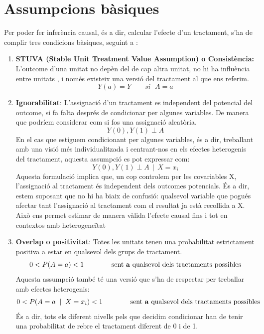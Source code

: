 \documentclass[../main.tex]{subfiles}
\begin{document}
    \section{Assumpcions bàsiques}\label{sec:assumpcions}
    Per poder fer inferència causal, és a dir, calcular l’efecte d’un tractament, s’ha de complir tres condicions bàsiques, seguint a \citep{abecassis2024}:
    \begin{enumerate}
        \item \textbf{STUVA (Stable Unit Treatment Value Assumption) o Consistència:} L’outcome d’una unitat no depèn del de cap altra unitat, no hi ha influència entre unitats , i només existeix una versió del tractament al que ens referim.
        \begin{equation}
            Y(a)=Y\qquad si\;\,\,A=a
        \end{equation}
        
        \item \textbf{Ignorabilitat}: L’assignació d’un tractament es independent del potencial del outcome, si fa falta després de condicionar per algunes variables. De manera que podríem considerar com si fos una assignació aleatòria.
        \begin{equation}
            Y(0),Y(1)\perp A
        \end{equation}
        En el cas que estiguem condicionant per algunes variables, és a dir, treballant amb una visió més individualitzada i centrant-nos en els efectes heterogenis del tractament, aquesta assumpció es pot expressar com:
        \begin{equation}
            Y(0),Y(1)\perp A\,\mid\,X=x_i
        \end{equation}
        Aquesta formulació implica que, un cop controlem per les covariables X, l’assignació al tractament és independent dels outcomes potencials. És a dir, estem suposant que no hi ha biaix de confusió: qualsevol variable que pogués afectar tant l’assignació al tractament com el resultat ja està recollida a X. Això ens permet estimar de manera vàlida l’efecte causal fins i tot en contextos amb heterogeneïtat

        \item \textbf{Overlap o positivitat}: Totes les unitats tenen una probabilitat estrictament positiva a estar en qualsevol dels grups de tractament.
        \begin{equation}
            0<P(A=a)<1 \qquad \qquad \text{sent \textbf{a} qualsevol dels tractaments possibles}
        \end{equation}
        Aquesta assumpció també té una versió que s’ha de respectar per treballar amb efectes heterogenis:
        \begin{equation}
            0<P(A=a\;\mid\; X=x_i)<1 \qquad \qquad \text{sent \textbf{a} qualsevol dels tractaments possibles}
        \end{equation}
        És a dir, tots els diferent nivells pels que decidim condicionar han de tenir una probabilitat de rebre el tractament diferent de 0 i de 1.
    \end{enumerate}
    
\end{document}
